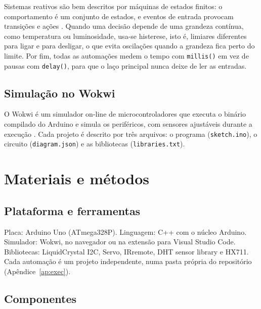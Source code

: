 \documentclass[12pt]{article}
\begin{document}
Sistemas reativos são bem descritos por máquinas de estados finitos: o comportamento é um conjunto de estados, e eventos de entrada provocam transições e ações \cite{lee2017}. Quando uma decisão depende de uma grandeza contínua, como temperatura ou luminosidade, usa-se histerese, isto é, limiares diferentes para ligar e para desligar, o que evita oscilações quando a grandeza fica perto do limite. Por fim, todas as automações medem o tempo com \texttt{millis()} em vez de pausas com \texttt{delay()}, para que o laço principal nunca deixe de ler as entradas.

\subsection{Simulação no Wokwi}

O Wokwi é um simulador on-line de microcontroladores que executa o binário compilado do Arduino e simula os periféricos, com sensores ajustáveis durante a execução \cite{wokwi2024}. Cada projeto é descrito por três arquivos: o programa (\texttt{sketch.ino}), o circuito (\texttt{diagram.json}) e as bibliotecas (\texttt{libraries.txt}).

\section{Materiais e métodos}\label{sec:metodos}

\subsection{Plataforma e ferramentas}

Placa: Arduino Uno (ATmega328P). Linguagem: C++ com o núcleo Arduino. Simulador: Wokwi, no navegador ou na extensão para Visual Studio Code. Bibliotecas: LiquidCrystal I2C, Servo, IRremote, DHT sensor library e HX711. Cada automação é um projeto independente, numa pasta própria do repositório (Apêndice~\ref{ap:exec}).

\subsection{Componentes}
\end{document}
